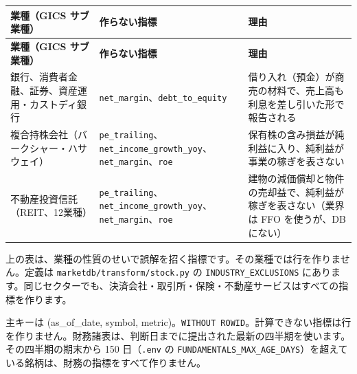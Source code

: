 \documentclass[xelatex,ja=standard,jafont=hiragino-pron,a4paper,10pt]{bxjsreport}
\begin{document}
{\footnotesize
\begin{longtable}{p{4.60cm}p{6.60cm}p{3.10cm}}
\toprule
\textbf{業種（GICS サブ業種）} & \textbf{作らない指標} & \textbf{理由} \\
\midrule
\endfirsthead
\toprule
\textbf{業種（GICS サブ業種）} & \textbf{作らない指標} & \textbf{理由} \\
\midrule
\endhead
\bottomrule
\endfoot
銀行、消費者金融、証券、資産運用・カストディ銀行 & \texttt{net\_\allowbreak{}margin}、\texttt{debt\_\allowbreak{}to\_\allowbreak{}equity} & 借り入れ（預金）が商売の材料で、売上高も利息を差し引いた形で報告される \\
複合持株会社（バークシャー・ハサウェイ） & \texttt{pe\_\allowbreak{}trailing}、\texttt{net\_\allowbreak{}income\_\allowbreak{}growth\_\allowbreak{}yoy}、\texttt{net\_\allowbreak{}margin}、\texttt{roe} & 保有株の含み損益が純利益に入り、純利益が事業の稼ぎを表さない \\
不動産投資信託（REIT、12業種） & \texttt{pe\_\allowbreak{}trailing}、\texttt{net\_\allowbreak{}income\_\allowbreak{}growth\_\allowbreak{}yoy}、\texttt{net\_\allowbreak{}margin}、\texttt{roe} & 建物の減価償却と物件の売却益で、純利益が稼ぎを表さない（業界は FFO を使うが、DB にない） \\
\end{longtable}
}
{\small 上の表は、業種の性質のせいで誤解を招く指標です。その業種では行を作りません。定義は \texttt{marketdb/transform/stock.py} の \texttt{INDUSTRY\_\allowbreak{}EXCLUSIONS} にあります。同じセクターでも、決済会社・取引所・保険・不動産サービスはすべての指標を作ります。\par}
\medskip
{\small 主キーは (as\_of\_date, symbol, metric)。\texttt{WITHOUT ROWID}。計算できない指標は行を作りません。財務諸表は、判断日までに提出された最新の四半期を使います。その四半期の期末から 150 日（\texttt{.env} の \texttt{FUNDAMENTALS\_\allowbreak{}MAX\_\allowbreak{}AGE\_\allowbreak{}DAYS}）を超えている銘柄は、財務の指標をすべて作りません。\par}
\medskip
\end{document}
